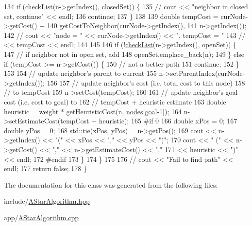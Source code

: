 \begin{DoxyCode}
134             \textcolor{keywordflow}{if} (\hyperlink{AStarAlgorithm_8cpp_a0d8733d22835ee24959813c563a8c878}{checkList}(n->getIndex(), closedSet)) \{
135                 \textcolor{comment}{// cout << "neighbor in closed set, continue" << endl;}
136                 \textcolor{keywordflow}{continue};
137             \}
138 
139             \textcolor{keywordtype}{double} tempCost = curNode->getCost() +
140                               getCostToNeighbor(curNode->getIndex(),
141                                                 n->getIndex());
142             \textcolor{comment}{// cout << "node = " << curNode->getIndex() << ", tempCost = "}
143             \textcolor{comment}{//     << tempCost << endl;}
144 
145 
146             \textcolor{keywordflow}{if} (!\hyperlink{AStarAlgorithm_8cpp_a0d8733d22835ee24959813c563a8c878}{checkList}(n->getIndex(), openSet)) \{
147                 \textcolor{comment}{// if neighbor not in open set, add}
148                 openSet.emplace\_back(n);
149             \} \textcolor{keywordflow}{else} \textcolor{keywordflow}{if} (tempCost >= n->getCost()) \{
150                 \textcolor{comment}{// not a better path}
151                 \textcolor{keywordflow}{continue};
152             \}
153 
154             \textcolor{comment}{// update neighbor's parent to current}
155             n->setParentIndex(curNode->getIndex());
156 
157             \textcolor{comment}{// update neighbor's cost (i.e. total cost to this node)}
158             \textcolor{comment}{// to tempCost}
159             n->setCost(tempCost);
160 
161             \textcolor{comment}{// update neighbor's goal cost (i.e. cost to goal) to}
162             \textcolor{comment}{// tempCost + heuristic estimate}
163             \textcolor{keywordtype}{double} heuristic = weight * getHeuristicCost(n, \hyperlink{classPathFindingAlgorithm_a131201eeaf50772259161b509007e0aa}{nodes}[\hyperlink{classPathFindingAlgorithm_ae8acf41f92ba72a969a44640c99fb8a4}{goal}-1]);
164             n->setEstimateCost(tempCost + heuristic);
165 \textcolor{preprocessor}{#if 0}
166 \textcolor{preprocessor}{}            \textcolor{keywordtype}{double} xPos = 0;
167             \textcolor{keywordtype}{double} yPos = 0;
168             std::tie(xPos, yPos) = n->getPos();
169             cout << n->getIndex() << \textcolor{stringliteral}{"("} << xPos << \textcolor{stringliteral}{","} << yPos << \textcolor{stringliteral}{")"};
170             cout << \textcolor{stringliteral}{" ("} << n->getCost() << \textcolor{stringliteral}{","} << n->getEstimateCost() << \textcolor{stringliteral}{","}
171                  << heuristic << \textcolor{stringliteral}{")"} << endl;
172 \textcolor{preprocessor}{#endif}
173 \textcolor{preprocessor}{}        \}
174     \}
175 
176     \textcolor{comment}{// cout << "Fail to find path" << endl;}
177     \textcolor{keywordflow}{return} \textcolor{keyword}{false};
178 \}
\end{DoxyCode}


The documentation for this class was generated from the following files\-:\begin{DoxyCompactItemize}
\item 
include/\hyperlink{AStarAlgorithm_8hpp}{A\-Star\-Algorithm.\-hpp}\item 
app/\hyperlink{AStarAlgorithm_8cpp}{A\-Star\-Algorithm.\-cpp}\end{DoxyCompactItemize}
